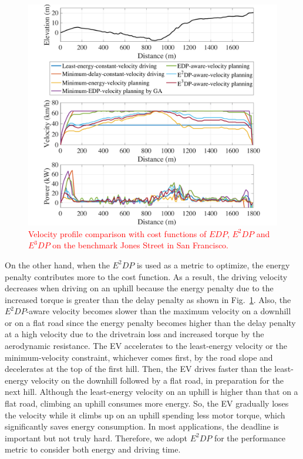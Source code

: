 \documentclass{IEEEtran}
\begin{document}
\begin{figure} %
\centering
\includegraphics[width=\hsize]{Figures/EDP_comp_profile.pdf}
\caption{\textcolor{red}{Velocity profile comparison with cost functions of $EDP$, $E^2DP$ and $E^3DP$ on the benchmark Jones Street in San Francisco.}}
\label{fig:EDP_aware_velocity_planning}
\end{figure} 

On the other hand, when the $E^2DP$ is used as a metric to optimize, the energy penalty contributes more to the cost function. As a result, the driving velocity decreases when driving on an uphill because the energy penalty due to the increased torque is greater than the delay penalty as shown in Fig.~\ref{fig:EDP_aware_velocity_planning}. Also, the $E^2DP$-aware velocity becomes slower than the maximum velocity on a downhill or on a flat road since the energy penalty becomes higher than the delay penalty at a high velocity due to the drivetrain loss and increased torque by the aerodynamic resistance. The EV accelerates to the least-energy velocity or the minimum-velocity constraint, whichever comes first, by the road slope and decelerates at the top of the first hill. Then, the EV drives faster than the least-energy velocity on the downhill followed by a  flat road, in preparation for the next hill. Although the least-energy velocity on an uphill is higher than that on a flat road, climbing an uphill consumes more energy. So, the EV gradually loses the velocity while it climbs up on an uphill spending less motor torque, which significantly saves energy consumption. In most applications, the deadline is important but not truly hard. Therefore, we adopt $E^2DP$ for the performance metric to consider both energy and driving time.
\end{document}
